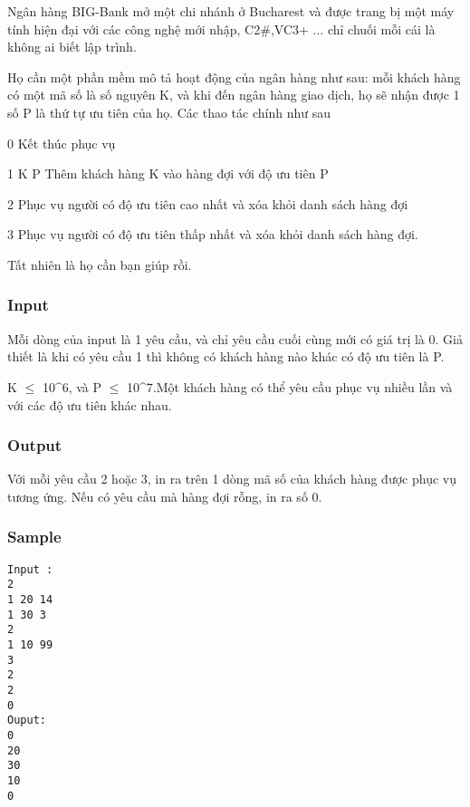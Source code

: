 



   Ngân hàng  BIG-Bank mở một chi nhánh ở Bucharest và được trang bị một máy tính hiện đại với các công nghệ mới nhập, C2\#,VC3+ ... chỉ chuối mỗi cái là không ai biết lập trình.  

   Họ cần một phần mềm mô tả hoạt động của ngân hàng như sau: mỗi khách hàng có một mã số là số nguyên K, và khi đến ngân hàng giao dịch, họ sẽ nhận được 1 số P là thứ tự ưu tiên của họ. Các thao tác chính như sau  

   0  Kết thúc phục vụ  

   1  K P Thêm khách hàng K vào hàng đợi với độ ưu tiên P  

   2  Phục vụ người có độ ưu tiên cao nhất và xóa khỏi danh sách hàng đợi  

   3  Phục vụ người có độ ưu tiên thấp nhất và xóa khỏi danh sách hàng đợi.  

   Tất nhiên là họ cần bạn giúp rồi.  



\subsubsection{   Input  }



   Mỗi dòng của input là 1 yêu cầu, và chỉ yêu cầu cuối cùng mới có giá trị là 0. Giả thiết là khi có yêu cầu 1 thì không có khách hàng nào khác có độ ưu tiên là P.  

   K $\le$ 10\textasciicircum6, và P $\le$  10\textasciicircum7.Một khách hàng có thể yêu cầu phục vụ nhiều lần và với các độ ưu tiên khác nhau.  



\subsubsection{   Output  }



   Với mỗi yêu cầu 2 hoặc 3, in ra trên 1 dòng mã số của khách hàng được phục vụ tương ứng. Nếu có yêu cầu mà hàng đợi rỗng, in ra số 0.  



\subsubsection{   Sample  }
\begin{verbatim}
Input :
2 
1 20 14 
1 30 3 
2 
1 10 99 
3 
2 
2 
0 
Ouput: 
0 
20 
30 
10 
0 
\end{verbatim}
